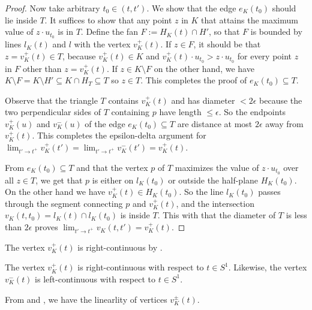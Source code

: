\begin{proof}
Now take arbitrary \(t_0 \in (t, t')\). We show that the edge \(e_K(t_0)\) should lie inside \(T\). It suffices to show that any point \(z\) in \(K\) that attains the maximum value of \(z \cdot u_{t_0}\) is in \(T\). Define the fan \(F := H_K(t) \cap H'\), so that \(F\) is bounded by lines \(l_K(t)\) and \(l\) with the vertex \(v_K^+(t)\). If \(z \in F\), it should be that \(z = v_K^+(t) \in T\), because \(v_K^+(t) \in K\) and \(v_K^+(t) \cdot u_{t_0} > z \cdot u_{t_0}\) for every point \(z\) in \(F\) other than \(z = v_K^+(t)\). If \(z \in K \setminus F\) on the other hand, we have \(K \setminus F = K \setminus H' \subseteq K \cap H_T \subseteq T\) so \(z \in T\). This completes the proof of \(e_K(t_0) \subseteq T\).

Observe that the triangle \(T\) contains \(v_K^+(t)\) and has diameter \(< 2\epsilon\) because the two perpendicular sides of \(T\) containing \(p\) have length \(\leq \epsilon\). So the endpoints \(v_K^+(u)\) and \(v_K^-(u)\) of the edge \(e_K(t_0) \subseteq T\) are distance at most \(2\epsilon\) away from \(v_K^+(t)\). This completes the epsilon-delta argument for \(\lim_{ t' \to t^+ } v_K^+(t') = \lim_{ t' \to t^+ } v_K^-(t') = v_K^+(t)\).

From \(e_K(t_0) \subseteq T\) and that the vertex \(p\) of \(T\) maximizes the value of \(z \cdot u_{t_0}\) over all \(z \in T\), we get that \(p\) is either on \(l_K(t_0)\) or outside the half-plane \(H_K(t_0)\). On the other hand we have \(v_K^+(t) \in H_K(t_0)\). So the line \(l_K(t_0)\) passes through the segment connecting \(p\) and \(v_K^+(t)\), and the intersection \(v_K(t, t_0) = l_K(t) \cap l_K(t_0)\) is inside \(T\). This with that the diameter of \(T\) is less than \(2 \epsilon\) proves \(\lim_{ t' \to t^+ } v_K(t, t') = v_K^+(t)\).
\end{proof}

The vertex \(v_K^+(t)\) is right-continuous by .

\begin{corollary}

The vertex \(v_K^+(t)\) is right-continuous with respect to \(t \in S^1\). Likewise, the vertex \(v_K^-(t)\) is left-continuous with respect to \(t \in S^1\).

\label{cor:vertex-right-continuous}
\end{corollary}

From  and , we have the linearlity of vertices \(v_K^{\pm}(t)\).

